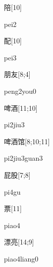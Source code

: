 \begin{verbete}[pei2]{陪}[10]
\begin{pronuncia}{pei2}
\end{pronuncia}
\end{verbete}

\begin{verbete}[pei3]{配}[10]
\begin{pronuncia}{pei3}
\end{pronuncia}
\end{verbete}

\begin{verbete}{朋友}[8;4]
\begin{pronuncia}{peng2you0}
\end{pronuncia}
\end{verbete}

\begin{verbete}[pi2jiu3]{啤酒}[11;10]
\begin{pronuncia}{pi2jiu3}
\end{pronuncia}
\end{verbete}

\begin{verbete}{啤酒馆}[8;10;11]
\begin{pronuncia}{pi2jiu3guan3}
\end{pronuncia}
\end{verbete}

\begin{verbete}[pi4gu]{屁股}[7;8]
\begin{pronuncia}{pi4gu}
\end{pronuncia}
\end{verbete}

\begin{verbete}[piao4]{票}[11]
\begin{pronuncia}{piao4}
\end{pronuncia}
\end{verbete}

\begin{verbete}{漂亮}[14;9]
\begin{pronuncia}{piao4liang0}
\end{pronuncia}
\end{verbete}

